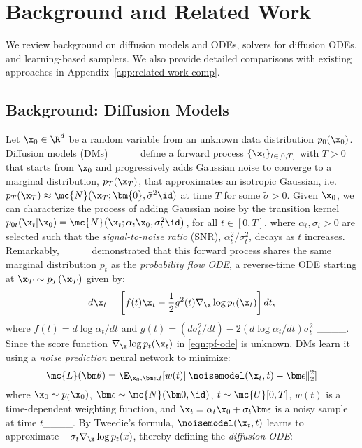 \section{Background and Related Work}
We review background on diffusion models and  ODEs, solvers for diffusion ODEs, and  learning-based samplers. 
We also provide detailed comparisons with existing approaches in Appendix~\ref{app:related-work-comp}.

\subsection{Background: Diffusion Models}
Let $\x_0\in\R^d$ be a random variable from an unknown data distribution $p_0(\x_0)$. 
Diffusion models (DMs)____ define a forward process $\{\x_t\}_{t\in[0,T]}$ with $T>0$ that starts from $\x_0$ and progressively adds Gaussian noise to converge to a marginal distribution, $p_T(\x_T)$, that approximates an isotropic Gaussian, i.e. $p_T(\x_T)\approx \mc{N}(\x_T;\bm{0}, \tilde\sigma^2\id)$ at time $T$ for some $\tilde\sigma>0$.
Given $\x_0$, we can characterize the process of adding Gaussian noise by the transition kernel
$p_{0t}(\x_t|\x_0)=\mc{N}\big(\x_t; \alpha_t\x_0, \sigma_t^2 \id\big)$,
for all $t\in[0,T]$, where $\alpha_t, \sigma_t > 0$ are selected such that the \emph{signal-to-noise ratio} (SNR), $\alpha_t^2/\sigma_t^2$, decays as $t$ increases.
Remarkably,____ demonstrated that this forward process shares the same marginal distribution $p_t$ as the \emph{probability flow ODE}, a reverse-time ODE starting at $\x_T\sim p_T(\x_T)$ given by:
\begin{equation}
    \label{eqn:pf-ode}
    d\x_t = \left[f(t)\x_t - \frac{1}{2}g^2(t)\nabla_\x \log p_t(\x_t)\right] dt,
\end{equation}
where $f(t)={d\log\alpha_t}/{dt}$ and $g(t)= ({d\sigma_t^2}/{dt})-2({d\log \alpha_t}/{dt})\sigma_t^2$ ____.
Since the score function $\nabla_\x\log p_t(\x_t)$ in \eqref{eqn:pf-ode} is unknown, DMs learn it using a \emph{noise prediction} neural network to minimize:
\begin{equation*}
    \mc{L}(\bm\theta)=\E_{\x_0, \bm\epsilon,t}[w(t)\|\noisemodel(\x_t,t)-\bm\epsilon\|_2^2]
\end{equation*}
where $\x_0\sim p_(\x_0)$, $\bm\epsilon\sim\mc{N}(\bm 0 , \id)$, $t\sim \mc{U}[0,T]$, $w(t)$ is a time-dependent weighting function, and $\x_t=\alpha_t\x_0+\sigma_t\bm\epsilon$ is a noisy sample at time $t$____.
By Tweedie's formula, $\noisemodel(\x_t,t)$ learns to approximate $-\sigma_t\nabla_\x\log p_t(x)$, thereby defining the \emph{diffusion ODE}:
